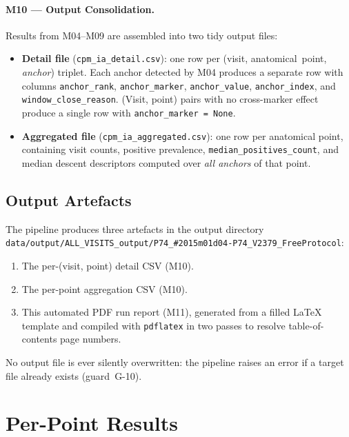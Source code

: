 \documentclass[a4paper,11pt]{article}
\begin{document}
\paragraph{M10 --- Output Consolidation.}
Results from M04--M09 are assembled into two tidy output files:
\begin{itemize}
  \item \textbf{Detail file} (\texttt{cpm\_ia\_detail.csv}): one row per
        (visit, anatomical~point, \emph{anchor}) triplet. Each anchor detected by M04
        produces a separate row with columns \texttt{anchor\_rank},
        \texttt{anchor\_marker}, \texttt{anchor\_value}, \texttt{anchor\_index},
        and \texttt{window\_close\_reason}.
        (Visit, point) pairs with no cross-marker effect produce a single row with
        \texttt{anchor\_marker = None}.
  \item \textbf{Aggregated file} (\texttt{cpm\_ia\_aggregated.csv}): one row per
        anatomical point, containing visit counts, positive prevalence,
        \texttt{median\_positives\_count}, and median descent descriptors computed over
        \emph{all anchors} of that point.
\end{itemize}

\subsection{Output Artefacts}

The pipeline produces three artefacts in the output directory \texttt{data/output/ALL\_VISITS\_output/P74\_\#2015m01d04-P74\_V2379\_FreeProtocol}:
\begin{enumerate}
  \item The per-(visit, point) detail CSV (M10).
  \item The per-point aggregation CSV (M10).
  \item This automated PDF run report (M11), generated from a filled \LaTeX{} template
        and compiled with \texttt{pdflatex} in two passes to resolve table-of-contents
        page numbers.
\end{enumerate}
No output file is ever silently overwritten: the pipeline raises an error if a target
file already exists (guard~G-10).

\section{Per-Point Results}
\end{document}
